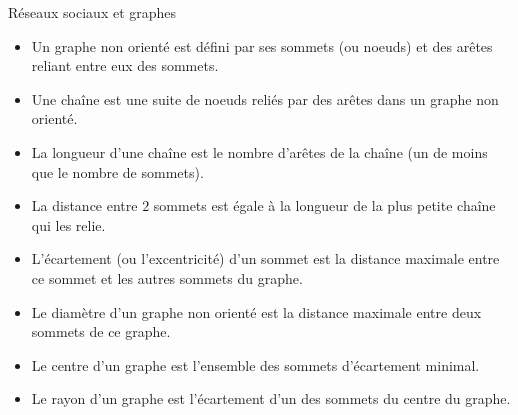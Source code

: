 \documentclass[a4paper, dvipsnames]{article}
\begin{document}
\begin{activite}[breakable]{Réseaux sociaux et graphes}{}
  \begin{itemize}
    \item Un graphe non orienté est défini par ses sommets (ou noeuds) et des arêtes reliant entre eux des sommets.
    \item Une chaîne est une suite de noeuds reliés par des arêtes dans un graphe non orienté.
    \item La longueur d'une chaîne est le nombre d'arêtes de la chaîne (un de moins que le nombre de sommets).
    \item La distance entre $2$ sommets est égale à la longueur de la plus petite chaîne qui les relie.
    \item L'écartement (ou l'excentricité) d'un sommet est la distance maximale entre ce sommet et les autres sommets du graphe.
    \item Le diamètre d'un graphe non orienté est la distance maximale entre deux sommets de ce graphe.
    \item Le centre d'un graphe est l'ensemble des sommets d'écartement minimal.
    \item Le rayon d'un graphe est l'écartement d'un des sommets du centre du graphe.
  \end{itemize} 


\end{activite}
\end{document}
